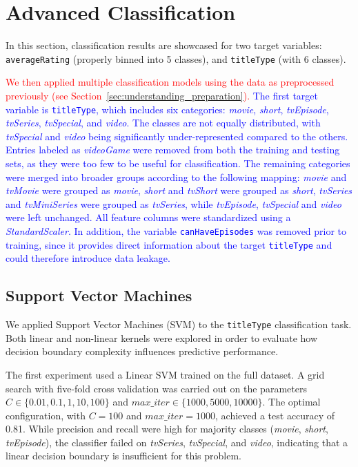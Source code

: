 \section{Advanced Classification}
\label{sec:advanced_classification}

In this section, classification results are showcased for two
target variables: \texttt{averageRating} (properly binned into
5 classes), and \texttt{titleType} (with 6 classes).

\textcolor{red}{We then applied multiple classification models using the data as preprocessed previously (see Section~\ref{sec:understanding_preparation}).}   
\textcolor{blue}{The first target variable is \texttt{titleType}, which includes six categories: 
\textit{movie}, \textit{short}, \textit{tvEpisode}, \textit{tvSeries}, 
\textit{tvSpecial}, and \textit{video}. 
The classes are not equally distributed, with \textit{tvSpecial} and \textit{video} 
being significantly under-represented compared to the others. Entries labeled as \textit{videoGame} were removed from both the training and testing sets, 
as they were too few to be useful for classification. 
The remaining categories were merged into broader groups according to the following mapping: 
\textit{movie} and \textit{tvMovie} were grouped as \textit{movie}, 
\textit{short} and \textit{tvShort} were grouped as \textit{short}, 
\textit{tvSeries} and \textit{tvMiniSeries} were grouped as \textit{tvSeries}, 
while \textit{tvEpisode}, \textit{tvSpecial} and \textit{video} were left unchanged. 
All feature columns were standardized using a \textit{StandardScaler}. 
In addition, the variable \texttt{canHaveEpisodes} was removed prior to training, 
since it provides direct information about the target \texttt{titleType} 
and could therefore introduce data leakage.}

\subsection{Support Vector Machines}
\label{subsec:svm}

We applied Support Vector Machines (SVM) to the \texttt{titleType} classification task.
Both linear and non-linear kernels were explored in order to evaluate how decision boundary complexity influences predictive performance.

The first experiment used a Linear SVM trained on the full dataset.  
A grid search with five-fold cross validation was carried out on the parameters 
$C \in \{0.01, 0.1, 1, 10, 100\}$ and $max\_iter \in \{1000, 5000, 10000\}$. 
The optimal configuration, with $C=100$ and $max\_iter=1000$, achieved a test accuracy of 0.81. 
While precision and recall were high for majority classes (\textit{movie}, \textit{short}, \textit{tvEpisode}), 
the classifier failed on \textit{tvSeries}, \textit{tvSpecial}, and \textit{video}, 
indicating that a linear decision boundary is insufficient for this problem.  

